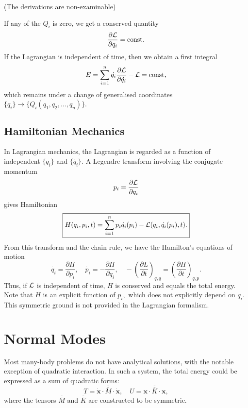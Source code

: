 \documentclass{article}
\begin{document}
(The derivations are non-examinable)

If any of the $Q_i$ is zero, we get a conserved quantity 
\[
    \frac{\partial \mathcal{\MakeUppercase{L}} }{\partial q_i} = \mathrm{const}.  
\]
If the Lagrangian is independent of time, then we obtain a first integral 
\[
    E = \sum_{i=1}^{n} \dot{q_i} \frac{\partial \mathcal{\MakeUppercase{L}} }{\partial \dot{q_i} } - \mathcal{\MakeUppercase{L}}  = \mathrm{const}, 
\]
which remains under a change of generalised coordinates $\{q_i\} \to \{Q_i(q_1, q_2, \ldots , q_n )\}.$
\subsection{Hamiltonian Mechanics}
In Lagrangian mechanics, the Lagrangian is regarded as a function of independent $\{q_i\}$ and $\{\dot{q_i}\}.$ A Legendre transform involving the conjugate momentum 
\[
    p_i = \frac{\partial \mathcal{\MakeUppercase{L}} }{\partial q_i} 
\]
gives Hamiltonian 
\[
    \boxed{ 
        H(q_i, p_i, t) = 
        \sum_{i=1}^{n} p_i \dot{q_i}(p_i) - \mathcal{\MakeUppercase{L}}(q_i, \dot{q_i}(p_i),t ). 
    }
\]
From this transform and the chain rule, we have the Hamilton's equations of motion
\[
    \dot{q_i} = \frac{\partial H}{\partial p_i}, \quad \dot{p_i} = -\frac{\partial H}{\partial q_i}, \quad 
    -\left( \frac{\partial L}{\partial t}   \right)_{q, \dot{q} } = \left(\frac{\partial H}{\partial t}\right)_{q,p}. 
\]
Thus, if $\mathcal{\MakeUppercase{L}} $ is independent of time, $H$ is conserved and equals the total energy. Note that $H$ is an explicit function of $p_i,$ which does not explicitly depend on $q_i.$ This symmetric ground is not provided in the Lagrangian formalism. 

\section{Normal Modes}
Most many-body problems do not have analytical solutions, with the notable exception of quadratic interaction. In such a system, the total energy could be expressed as a sum of quadratic forms:
\[
    T = \dot{\mathbf{x} } \cdot \overline{\overline{M}} \cdot \dot{\mathbf{x} }, \quad 
    U = \mathbf{x} \cdot \overline{\overline{K}} \cdot \mathbf{x}, 
\]
where the tensors $\overline{\overline{M}} $ and $\overline{\overline{K}} $ are constructed to be symmetric. 
\end{document}
